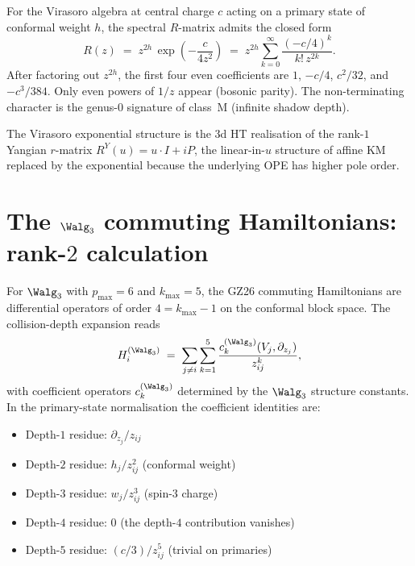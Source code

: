 \begin{computation}
\label{comp:dnp-master-virasoro-r-matrix}
For the Virasoro algebra at central charge $c$ acting on a primary state
of conformal weight $h$, the spectral $R$-matrix admits the closed form
\begin{equation}
\label{eq:dnp-master-virasoro-r-closed}
R(z)
\;=\;
z^{2h}\,\exp\!\left(-\frac{c}{4z^2}\right)
\;=\;
z^{2h}\sum_{k=0}^{\infty}\frac{(-c/4)^k}{k!\,z^{2k}}.
\end{equation}
After factoring out $z^{2h}$, the first four even coefficients are
$1$, $-c/4$, $c^2/32$, and $-c^3/384$.
Only even powers of $1/z$ appear (bosonic parity). The non-terminating
character is the genus-$0$ signature of class~M (infinite shadow depth).
\end{computation}

The Virasoro exponential structure is the 3d HT realisation of
the rank-$1$ Yangian $r$-matrix $R^Y(u) = u\cdot I + iP$, the
linear-in-$u$ structure of affine KM replaced by the exponential
because the underlying OPE has higher pole order.

\section{The $\Walg_3$ commuting Hamiltonians: rank-$2$ calculation}
\label{sec:dnp-master-w3-hamiltonians}

For $\Walg_3$ with $p_{\max} = 6$ and $k_{\max} = 5$, the GZ26
commuting Hamiltonians are differential operators of order
$4 = k_{\max} - 1$ on the conformal block space. The
collision-depth expansion reads
\[
H_i^{(\Walg_3)}
\;=\;
\sum_{j\neq i}
\sum_{k=1}^{5}
\frac{c_k^{(\Walg_3)}(V_j,\partial_{z_j})}{z_{ij}^k},
\]
with coefficient operators $c_k^{(\Walg_3)}$ determined by the
$\Walg_3$ structure constants. In the primary-state normalisation
the coefficient identities are:
\begin{itemize}
\item Depth-$1$ residue: $\partial_{z_j}/z_{ij}$
\item Depth-$2$ residue: $h_j/z_{ij}^2$ (conformal weight)
\item Depth-$3$ residue: $w_j/z_{ij}^3$ (spin-$3$ charge)
\item Depth-$4$ residue: $0$ (the depth-$4$ contribution vanishes)
\item Depth-$5$ residue: $(c/3)/z_{ij}^5$ (trivial on primaries)
\end{itemize}

